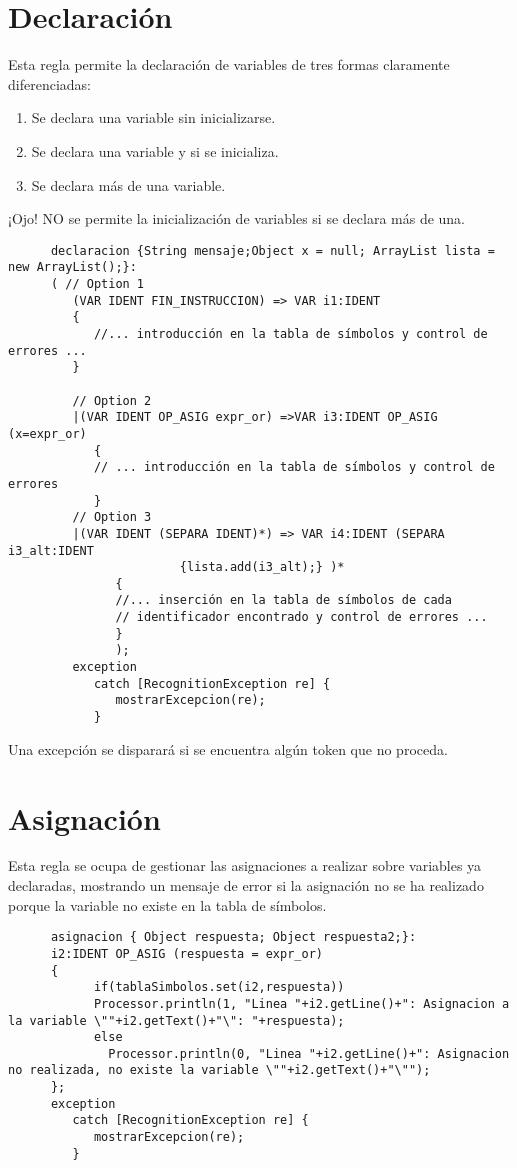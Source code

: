    \section{Declaración}
   Esta regla permite la declaración de variables de tres formas claramente diferenciadas:
   \begin{enumerate}
      \item Se declara una variable sin inicializarse.
      \item Se declara una variable y si se inicializa.
      \item Se declara más de una variable.
   \end{enumerate}
   ¡Ojo! NO se permite la inicialización de variables si se declara más de una.
   \begin{lstlisting}
      declaracion {String mensaje;Object x = null; ArrayList lista = new ArrayList();}:
      ( // Option 1
         (VAR IDENT FIN_INSTRUCCION) => VAR i1:IDENT
         { 
            //... introducción en la tabla de símbolos y control de errores ...
         }
         
         // Option 2
         |(VAR IDENT OP_ASIG expr_or) =>VAR i3:IDENT OP_ASIG (x=expr_or) 
            {     
            // ... introducción en la tabla de símbolos y control de errores
            }
         // Option 3
         |(VAR IDENT (SEPARA IDENT)*) => VAR i4:IDENT (SEPARA i3_alt:IDENT
                        {lista.add(i3_alt);} )* 
               {
               //... inserción en la tabla de símbolos de cada
               // identificador encontrado y control de errores ...
               }
               );
         exception
            catch [RecognitionException re] {
               mostrarExcepcion(re);
            }
   \end{lstlisting} 
   Una excepción se disparará si se encuentra algún token que no proceda.\\
      
   \section{Asignación}
   Esta regla se ocupa de gestionar las asignaciones a realizar sobre variables ya declaradas, mostrando un mensaje de error 
   si la asignación no se ha realizado porque la variable no existe en la tabla de símbolos.
   \begin{lstlisting}
      asignacion { Object respuesta; Object respuesta2;}:
      i2:IDENT OP_ASIG (respuesta = expr_or)
      {   
            if(tablaSimbolos.set(i2,respuesta)) 
            Processor.println(1, "Linea "+i2.getLine()+": Asignacion a la variable \""+i2.getText()+"\": "+respuesta);
            else 
              Processor.println(0, "Linea "+i2.getLine()+": Asignacion no realizada, no existe la variable \""+i2.getText()+"\"");
      };
      exception
         catch [RecognitionException re] {
            mostrarExcepcion(re);
         }
   \end{lstlisting}

